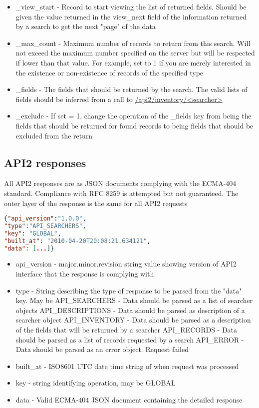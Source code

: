 \documentclass[11pt]{article}
\begin{document}
\begin{itemize}
\item \_view\_start - Record to start viewing the list of returned fields. Should be given the value returned in the view\_next field of the information returned by a search to get the next "page" of the data
\item \_max\_count - Maximum number of records to return from this search. Will not exceed the maximum number specified on the server but will be respected if lower than that value. For example, set to 1 if you are merely interested in the existence or non-existence of records of the specified type
\item \_fields - The fields that should be returned by the search. The valid lists of fields should be inferred from a call to \url{/api2/inventory/<searcher>} 
\item \_exclude - If set = 1, change the operation of the \_fields key from being the fields that should be returned for found records to being fields that should be excluded from the return
\end{itemize}

\subsection{API2 responses}
All API2 responses are as JSON documents complying with the ECMA-404 standard. Compliance with RFC 8259 is attempted but not guaranteed. The outer layer of the response is the same for all API2 requests

\begin{lstlisting}[language=json,firstnumber=1]
{"api_version":"1.0.0",
"type":"API_SEARCHERS",
"key": "GLOBAL",
"built_at": "2010-04-20T20:08:21.634121",
"data": [...]}
\end{lstlisting}
\begin{itemize}
\item api\_version - major.minor.revision string value showing version of API2 interface that the response is complying with
\item type - String describing the type of response to be parsed from the "data" key. May be
\subitem API\_SEARCHERS - Data should be parsed as a list of searcher objects
\subitem API\_DESCRIPTIONS - Data should be parsed as description of a searcher object
\subitem API\_INVENTORY - Data should be parsed as a description of the fields that will be returned by a searcher
\subitem API\_RECORDS - Data should be parsed as a list of records requested by a search
\subitem API\_ERROR - Data should be parsed as an error object. Request failed
\item built\_at - ISO8601 UTC date time string of when request was processed
\item key - string identifying operation, may be GLOBAL
\item data - Valid ECMA-404 JSON document containing the detailed response
\end{itemize}
\end{document}
